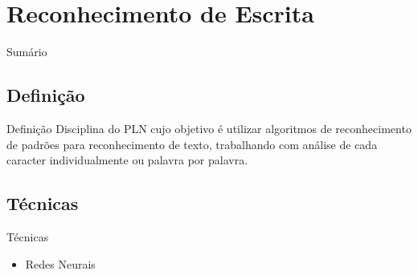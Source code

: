\renewcommand{\titulo}{Reconhecimento de Escrita}
\section{\titulo}

\begin{frame}{Sumário}
\tableofcontents[currentsection]
\end{frame}

\renewcommand{\titulo}{Definição}
\subsection{\titulo}
\begin{frame}{\titulo}
Disciplina do PLN cujo objetivo é utilizar algoritmos de reconhecimento de padrões para reconhecimento de texto, trabalhando com análise de cada caracter individualmente ou palavra por palavra.
\end{frame}

\renewcommand{\titulo}{Técnicas}
\subsection{\titulo}
\begin{frame}{\titulo}
\begin{itemize}
\item Redes Neurais
\end{itemize}
\end{frame}

